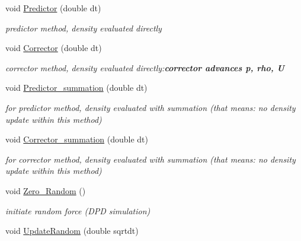 \begin{CompactItemize}
void \hyperlink{classHydrodynamics_316a6079bf22102d9b911e2632cd2680}{Predictor} (double dt)
\begin{CompactList}\small\item\em predictor method, density evaluated directly \item\end{CompactList}\item 
void \hyperlink{classHydrodynamics_928a3fb7752d458026ed06dca1fbf137}{Corrector} (double dt)
\begin{CompactList}\small\item\em corrector method, density evaluated directly:{\bf  corrector advances p, rho, U} \item\end{CompactList}\item 
void \hyperlink{classHydrodynamics_911fe25b94fec398fad1f2def036d755}{Predictor\_\-summation} (double dt)
\begin{CompactList}\small\item\em for predictor method, density evaluated with summation (that means: no density update within this method) \item\end{CompactList}\item 
void \hyperlink{classHydrodynamics_6a62dad5b8c33b504481a8e4e5b023cb}{Corrector\_\-summation} (double dt)
\begin{CompactList}\small\item\em for corrector method, density evaluated with summation (that means: no density update within this method) \item\end{CompactList}\item 
void \hyperlink{classHydrodynamics_f67579320cbdccaf49bbdf3dfb13f23c}{Zero\_\-Random} ()
\begin{CompactList}\small\item\em initiate random force (DPD simulation) \item\end{CompactList}\item 
\hypertarget{classHydrodynamics_2ea6824bef3da552942cbf0c0653a4c0}{
void \hyperlink{classHydrodynamics_2ea6824bef3da552942cbf0c0653a4c0}{UpdateRandom} (double sqrtdt)}
\label{classHydrodynamics_2ea6824bef3da552942cbf0c0653a4c0}


\end{CompactItemize}
